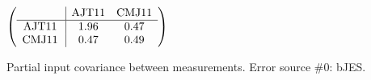 \begin{table}[H]
\scriptsize
\begin{center}
\renewcommand{\arraystretch}{1.1}
\begin{math}\left(\begin{array}{c|cc}
 & \mathrm{AJT11} & 
\mathrm{CMJ11} \\
\hline
\mathrm{AJT11} \hspace*{2pt} &       1.96 &       0.47 \\
\mathrm{CMJ11} \hspace*{2pt} &       0.47 &       0.49 \\
\end{array}\right)\end{math}
\caption{Partial input covariance between measurements. Error source \#0: bJES.}
\renewcommand{\arraystretch}{1}
\end{center}
\end{table}
\clearpage
